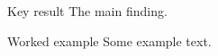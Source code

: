 \documentclass{ltx-talk}
\begin{document}
\begin{frame}
  \begin{alertblock}{Key result}
    The main finding.
  \end{alertblock}
  \begin{exampleblock}{Worked example}
    Some example text.
  \end{exampleblock}
\end{frame}
\end{document}
